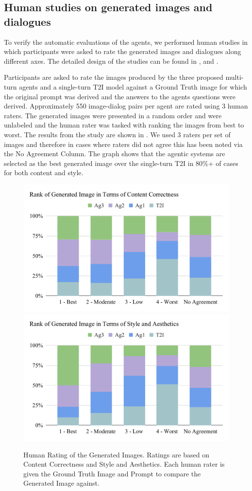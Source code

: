 \subsection{Human studies on generated images and dialogues}
To verify the automatic evaluations of the agents, we performed human studies in which participants were asked to rate the generated images and dialogues along different axes. The detailed design of the studies can be found in ,  and  .

Participants are asked to rate the images produced by the three proposed multi-turn agents and a single-turn T2I model against a Ground Truth image for which the original prompt was derived and the answers to the agents questions were derived. Approximately 550 image-dialog pairs per agent are rated using 3 human raters. The generated images were presented in a random order and were unlabeled and the human rater was tasked with ranking the images from best to worst. The results from the study are shown in .
We used 3 raters per set of images and therefore in cases where raters did not agree this has been noted via the No Agreement Column. The graph shows that the agentic systems are selected as the best generated image over the single-turn T2I in 80\%+ of cases for both content and style. 

\begin{figure}
    \centering
    \includegraphics[width=.45\textwidth]{figures/Rank_Content_Correctness.pdf}
    \includegraphics[width=.45\textwidth]{figures/Rank_Aesthetics.pdf}
    \caption{Human Rating of the Generated Images. Ratings are based on Content Correctness and Style and Aesthetics. Each human rater is given the Ground Truth Image and Prompt to compare the Generated Image against.}
    \label{fig:rating_human_rank}
\end{figure}

